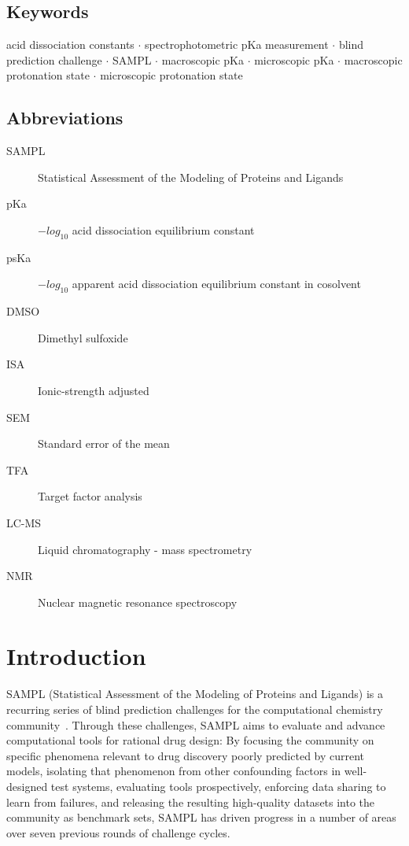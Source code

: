 \documentclass[9pt,lineno]{elife}
\begin{document}
\subsection{Keywords}
acid dissociation constants $\cdot$ spectrophotometric pKa measurement $\cdot$ blind prediction challenge $\cdot$ SAMPL $\cdot$ macroscopic pKa $\cdot$ microscopic pKa  $\cdot$ macroscopic protonation state $\cdot$ microscopic protonation state

\subsection{Abbreviations}
\begin{description}
\item[SAMPL] Statistical Assessment of the Modeling of Proteins and Ligands
\item[pKa] $-log_{10}$ acid dissociation equilibrium constant
\item[psKa] $-log_{10}$ apparent acid dissociation equilibrium constant in cosolvent
\item[DMSO] Dimethyl sulfoxide
\item[ISA] Ionic-strength adjusted
\item[SEM] Standard error of the mean
\item[TFA] Target factor analysis
\item[LC-MS] Liquid chromatography - mass spectrometry
\item[NMR] Nuclear magnetic resonance spectroscopy
\end{description}

\section{Introduction}

SAMPL (Statistical Assessment of the Modeling of Proteins and Ligands) is a recurring series of blind prediction challenges for the computational chemistry community~\citep{mobley_advancing_2016, sample_D3R_website}. Through these challenges, SAMPL aims to evaluate and advance computational tools for rational drug design: By focusing the community on specific phenomena relevant to drug discovery poorly predicted by current models, isolating that phenomenon from other confounding factors in well-designed test systems, evaluating tools prospectively, enforcing data sharing to learn from failures, and releasing the resulting high-quality datasets into the community as benchmark sets, SAMPL has driven progress in a number of areas over seven previous rounds of challenge cycles.
\end{document}
